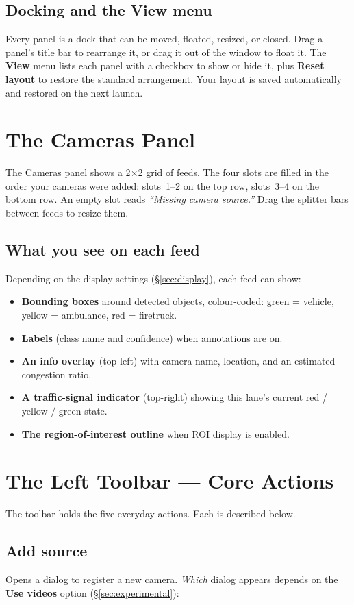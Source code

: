 \documentclass[11pt]{article}
\newcommand{\ui}[1]{\textbf{#1}}
\begin{document}
\subsection{Docking and the View menu}
Every panel is a dock that can be moved, floated, resized, or closed. Drag a
panel's title bar to rearrange it, or drag it out of the window to float it.
The \ui{View} menu lists each panel with a checkbox to show or hide it, plus
\ui{Reset layout} to restore the standard arrangement. Your layout is saved
automatically and restored on the next launch.

\section{The Cameras Panel}
The Cameras panel shows a 2$\times$2 grid of feeds. The four slots are filled in
the order your cameras were added: slots~1--2 on the top row, slots~3--4 on the
bottom row. An empty slot reads \emph{``Missing camera source.''} Drag the
splitter bars between feeds to resize them.

\subsection{What you see on each feed}
Depending on the display settings (\S\ref{sec:display}), each feed can show:
\begin{itemize}[nosep]
  \item \textbf{Bounding boxes} around detected objects, colour-coded:
        green = vehicle, yellow = ambulance, red = firetruck.
  \item \textbf{Labels} (class name and confidence) when annotations are on.
  \item \textbf{An info overlay} (top-left) with camera name, location, and an
        estimated congestion ratio.
  \item \textbf{A traffic-signal indicator} (top-right) showing this lane's
        current red / yellow / green state.
  \item \textbf{The region-of-interest outline} when ROI display is enabled.
\end{itemize}

\section{The Left Toolbar --- Core Actions}
The toolbar holds the five everyday actions. Each is described below.

\subsection{Add source}
Opens a dialog to register a new camera. \emph{Which} dialog appears depends on
the \ui{Use videos} option (\S\ref{sec:experimental}):
\end{document}
